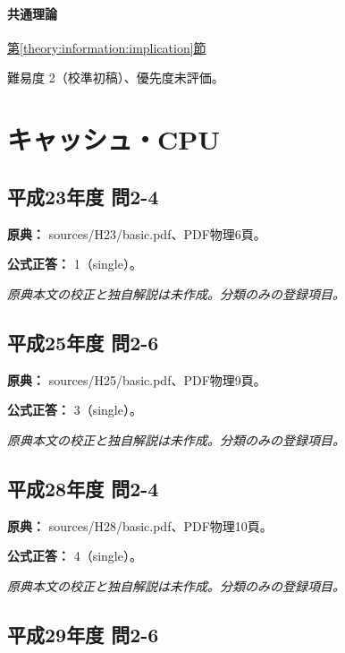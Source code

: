 \paragraph{共通理論} \hyperref[theory:information:implication]{第\ref*{theory:information:implication}節}

\par 難易度 2（校準初稿）、優先度未評価。

\section{キャッシュ・CPU}

\subsection{平成23年度 問2-4}
\label{q:h23-reg-basic-2-4}

\noindent\textbf{原典：} sources/H23/basic.pdf、PDF物理6頁。

\textbf{公式正答：} 1（single）。

\par\textit{原典本文の校正と独自解説は未作成。分類のみの登録項目。}

\subsection{平成25年度 問2-6}
\label{q:h25-reg-basic-2-6}

\noindent\textbf{原典：} sources/H25/basic.pdf、PDF物理9頁。

\textbf{公式正答：} 3（single）。

\par\textit{原典本文の校正と独自解説は未作成。分類のみの登録項目。}

\subsection{平成28年度 問2-4}
\label{q:h28-reg-basic-2-4}

\noindent\textbf{原典：} sources/H28/basic.pdf、PDF物理10頁。

\textbf{公式正答：} 4（single）。

\par\textit{原典本文の校正と独自解説は未作成。分類のみの登録項目。}

\subsection{平成29年度 問2-6}
\label{q:h29-reg-basic-2-6}


